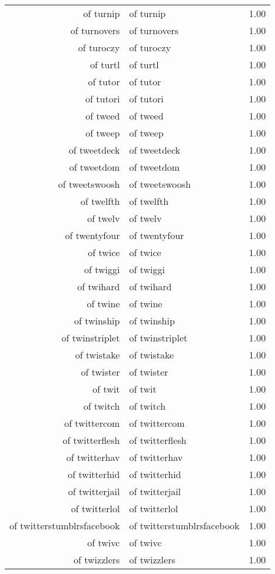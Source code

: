 \begin{table}[ht]
\begin{tabular}{rlr}
  of turnip & of turnip & 1.00 \\ 
  of turnovers & of turnovers & 1.00 \\ 
  of turoczy & of turoczy & 1.00 \\ 
  of turtl & of turtl & 1.00 \\ 
  of tutor & of tutor & 1.00 \\ 
  of tutori & of tutori & 1.00 \\ 
  of tweed & of tweed & 1.00 \\ 
  of tweep & of tweep & 1.00 \\ 
  of tweetdeck & of tweetdeck & 1.00 \\ 
  of tweetdom & of tweetdom & 1.00 \\ 
  of tweetswoosh & of tweetswoosh & 1.00 \\ 
  of twelfth & of twelfth & 1.00 \\ 
  of twelv & of twelv & 1.00 \\ 
  of twentyfour & of twentyfour & 1.00 \\ 
  of twice & of twice & 1.00 \\ 
  of twiggi & of twiggi & 1.00 \\ 
  of twihard & of twihard & 1.00 \\ 
  of twine & of twine & 1.00 \\ 
  of twinship & of twinship & 1.00 \\ 
  of twinstriplet & of twinstriplet & 1.00 \\ 
  of twistake & of twistake & 1.00 \\ 
  of twister & of twister & 1.00 \\ 
  of twit & of twit & 1.00 \\ 
  of twitch & of twitch & 1.00 \\ 
  of twittercom & of twittercom & 1.00 \\ 
  of twitterflesh & of twitterflesh & 1.00 \\ 
  of twitterhav & of twitterhav & 1.00 \\ 
  of twitterhid & of twitterhid & 1.00 \\ 
  of twitterjail & of twitterjail & 1.00 \\ 
  of twitterlol & of twitterlol & 1.00 \\ 
  of twitterstumblrsfacebook & of twitterstumblrsfacebook & 1.00 \\ 
  of twivc & of twivc & 1.00 \\ 
  of twizzlers & of twizzlers & 1.00 \\ 

\end{tabular}
\end{table}
